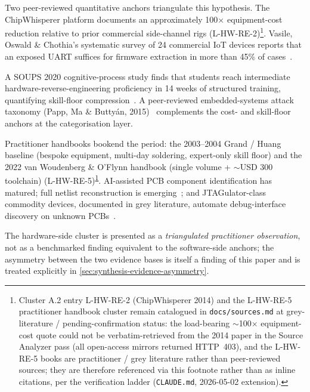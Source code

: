 \documentclass[11pt,a4paper]{article}
\begin{document}
Two peer-reviewed quantitative anchors triangulate this hypothesis. The
ChipWhisperer platform documents an approximately 100$\times$
equipment-cost reduction relative to prior commercial side-channel
rigs (L-HW-RE-2)\footnote{Cluster A.2 entry L-HW-RE-2 (ChipWhisperer
2014) and the L-HW-RE-5 practitioner handbook cluster remain
catalogued in \texttt{docs/sources.md} at grey-literature /
pending-confirmation status: the load-bearing $\sim$100$\times$
equipment-cost quote could not be verbatim-retrieved from the 2014
paper in the Source Analyzer pass (all open-access mirrors returned
HTTP~403), and the L-HW-RE-5 books are practitioner / grey literature
rather than peer-reviewed sources; they are therefore referenced via
this footnote rather than as inline citations, per the verification
ladder (\texttt{CLAUDE.md}, 2026-05-02
extension).\label{fn:hwre-cluster}}. Vasile, Oswald \& Chothia's
systematic survey of 24 commercial IoT devices reports that an
exposed UART suffices for firmware extraction in more than 45\% of
cases~\citep{vasile2018breakingallthethings}.

A SOUPS 2020 cognitive-process study finds that students reach
intermediate hardware-reverse-engineering proficiency in 14 weeks of
structured training, quantifying skill-floor
compression~\citep{becker2020hwreexploratory}. A peer-reviewed
embedded-systems attack taxonomy (Papp, Ma \& Butty{\'a}n,
2015)~\citep{papp2015embedded} complements the cost- and skill-floor
anchors at the categorisation layer.

Practitioner handbooks bookend the period: the 2003--2004 Grand /
Huang baseline (bespoke equipment, multi-day soldering, expert-only
skill floor) and the 2022 van Woudenberg \& O'Flynn handbook (single
volume + $\sim$USD 300 toolchain)
(L-HW-RE-5)\textsuperscript{\ref{fn:hwre-cluster}}. AI-assisted PCB
component identification has matured; full netlist reconstruction is
emerging~\citep{botero2021hwretutorial}; and JTAGulator-class
commodity devices, documented in grey literature, automate
debug-interface discovery on unknown PCBs~\citep{grand2013jtagulator}.

The hardware-side cluster is presented as a \emph{triangulated
practitioner observation}, not as a benchmarked finding equivalent to
the software-side anchors; the asymmetry between the two evidence
bases is itself a finding of this paper and is treated explicitly in
\cref{sec:synthesis-evidence-asymmetry}.
\end{document}
